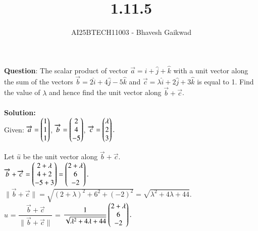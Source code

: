 \documentclass[journal]{IEEEtran}
\begin{document}

\vspace{3cm}

\title{1.11.5}
\author{AI25BTECH11003 - Bhavesh Gaikwad}
{\let\newpage\relax\maketitle}

\renewcommand{\thefigure}{\theenumi}
\renewcommand{\thetable}{\theenumi}
\setlength{\intextsep}{10pt} 


\renewcommand{\thetable}{\theenumi}


\textbf{Question}: The scalar product of vector $\overrightarrow{a} = \hat{i} + \hat{j} + \hat{k}$ with a unit vector along the sum of the vectors $\overrightarrow{b} =2\hat{i} + 4\hat{j} - 5\hat{k}$ and $\overrightarrow{c} = \lambda\hat{i} + 2\hat{j} + 3\hat{k}$ is equal to 1. Find the value of $\lambda$ and hence find the unit vector along $\overrightarrow{b} + \overrightarrow{c}$. \\\\

\textbf{Solution:}\\

 Given: $\overrightarrow{a}=\begin{pmatrix}1\\1\\1\end{pmatrix}$,  $\overrightarrow{b}=\begin{pmatrix}2\\4\\-5\end{pmatrix}$,  $\overrightarrow{c}=\begin{pmatrix}\lambda\\2\\3\end{pmatrix}.$

Let $\hat{u}$ be the unit vector along $\overrightarrow{b} + \overrightarrow{c} .$ \\

$ \overrightarrow{b} + \overrightarrow{c} = \begin{pmatrix}2+\lambda\\4+2\\-5+3\end{pmatrix}
=\begin{pmatrix}2+\lambda\\6\\-2\end{pmatrix}.$ \\

$\|\overrightarrow{b}+\overrightarrow{c}\| = \sqrt{(2+\lambda)^2+6^2+(-2)^2}
 = \sqrt{\lambda^2+4\lambda+44}.$ \\

$\hat{u}$ = $\dfrac{\overrightarrow{b} + \overrightarrow{c}}{\|\overrightarrow{b}+\overrightarrow{c}\|}$ = $\dfrac{1}{\sqrt{\lambda^2+4\lambda+44}} \begin{pmatrix}2+\lambda\\6\\-2\end{pmatrix}.$ \\\\
\end{document}
